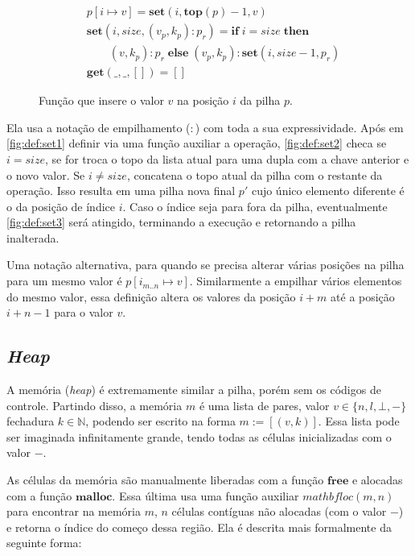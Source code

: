 \begin{figure}[ht]
	\begin{align}
	&p[i \mapsto v] = \mathbf{set}(i, \mathbf{top}(p) - 1, v) \label{fig:def:set1}\\
	&\mathbf{set}(i, size, (v_p, k_p) : p_r) = \mathbf{if}\;i = size \;\mathbf{then} \nonumber\\ 
	&\quad\quad(v, k_p) : p_r\;\mathbf{else}\;(v_p, k_p) : \mathbf{set}(i, size - 1, p_r) \label{fig:def:set2}\\
	&\mathbf{get}(\_, \_, []) = [] \label{fig:def:set3}
	\end{align}
	\caption{Função que insere o valor $v$ na posição $i$ da pilha $p$.}
	\label{fig:def:set}
\end{figure}

Ela usa a notação de empilhamento ($:$) com toda a sua expressividade. Após em \ref{fig:def:set1} definir via uma função auxiliar a operação, \ref{fig:def:set2} checa se $i = size$, se for troca o topo da lista atual para uma dupla com a chave anterior e o novo valor. Se $i \neq size$, concatena o topo atual da pilha com o restante da operação. Isso resulta em uma pilha nova final $p'$ cujo único elemento diferente é o da posição de índice $i$. Caso o índice seja para fora da pilha, eventualmente \ref{fig:def:set3} será atingido, terminando a execução e retornando a pilha inalterada.

Uma notação alternativa, para quando se precisa alterar várias posições na pilha para um mesmo valor é $p[i_{m..n} \mapsto v]$. Similarmente a empilhar vários elementos do mesmo valor, essa definição altera os valores da posição $i + m$ até a posição $i + n - 1$ para o valor $v$.


\subsection{\emph{Heap}}

A memória (\emph{heap}) é extremamente similar a pilha, porém sem os códigos de controle. Partindo disso, a memória $m$ é uma lista de pares, valor $v \in \{n, l, \bot, -\}$ fechadura $k \in \mathbb{N}$, podendo ser escrito na forma $m := [(v, k)]$. Essa lista pode ser imaginada infinitamente grande, tendo todas as células inicializadas com o valor $-$.

As células da memória são manualmente liberadas com a função $\mathbf{free}$ e alocadas com a função $\mathbf{malloc}$. Essa última usa uma função auxiliar $mathbf{loc(m,n)}$ para encontrar na memória $m$, $n$ células contíguas não alocadas (com o valor $-$) e retorna o índice do começo dessa região. Ela é descrita mais formalmente da seguinte forma:


